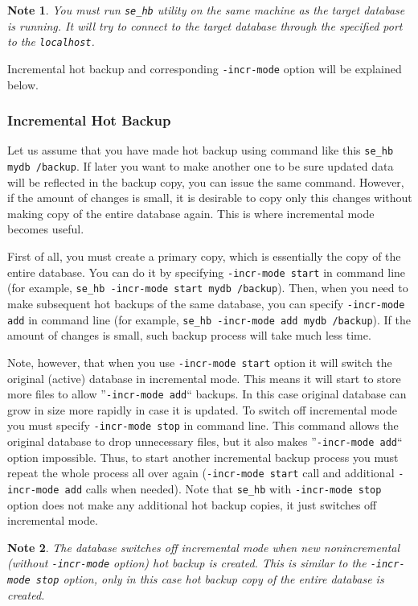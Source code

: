 \documentclass[a4paper,12pt]{article}
\newtheorem{note}{Note}
\begin{document}
\begin{note}
You must run \verb!se_hb! utility on the same machine as the target database is running. It will try to connect to 
the target database through the specified port to the \verb!localhost!.
\end{note}

Incremental hot backup and corresponding \verb!-incr-mode! option will be explained below.

\subsubsection*{Incremental Hot Backup}

Let us assume that you have made hot backup using command like this \verb!se_hb mydb /backup!. If later you want
to make another one to be sure updated data will be reflected in the backup copy, you can issue the same command.
However, if the amount of changes is small, it is desirable to copy only this changes without making copy of the entire 
database again. This is where incremental mode becomes useful.

First of all, you must create a primary copy, which is essentially the copy of the entire database. You can do it by
specifying \verb!-incr-mode start! in command line (for example, \verb!se_hb -incr-mode start mydb /backup!). 
Then, when you 
need to make subsequent hot backups of the same database, you can specify \verb!-incr-mode add! in command line
(for example, \verb!se_hb -incr-mode add mydb /backup!). If the amount of changes is small, such backup process will take
much less time.

Note, however, that when you use \verb!-incr-mode start! option it will switch the original (active) database in incremental mode.
This means it will start to store more files to allow ''\verb!-incr-mode add!`` backups. In this case original database can grow
in size more rapidly in case it is updated. To switch off incremental mode you must specify \verb!-incr-mode stop! in command line. This command
allows the original database to drop unnecessary files, but it also makes ''\verb!-incr-mode add!`` option impossible. Thus, to 
start another incremental backup process you must repeat the whole process all over again (\verb!-incr-mode start! call and additional
\verb!-incr-mode add! calls when needed). Note that \verb!se_hb! with \verb!-incr-mode stop! option does not make any 
additional hot backup copies, it just switches off incremental mode.

\begin{note}
The database switches off incremental mode when new nonincremental (without \verb!-incr-mode! option)
hot backup is created. This is similar to the \verb!-incr-mode stop! option, only in this case hot backup copy of the
entire database is created.
\end{note}
\end{document}
